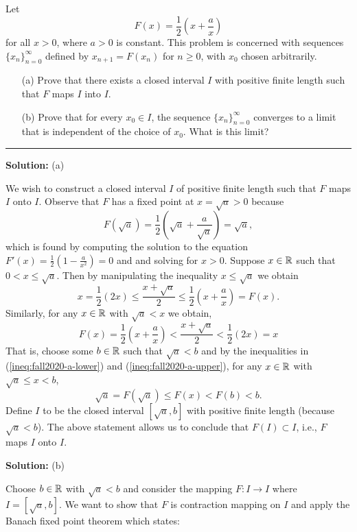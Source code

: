 \documentclass{article}
\begin{document}
Let 
	\[F(x) = \frac{1}{2}\left(x + \frac{a}{x}\right)\]
		for all $x>0$, where $a>0$ is constant. 
		This problem is concerned with sequences $\{x_n\}_{n=0}^\infty$ 
		defined by $x_{n+1} = F(x_n)$ for $n\geq 0$, with $x_0$ chosen arbitrarily.
	\begin{enumerate}
		\item[(a)] Prove that there exists a closed interval $I$ with positive finite length such that $F$ maps $I$ into $I$.
		
		\item[(b)] Prove that for every $x_0\in I$, the sequence $\{x_n\}_{n=0}^\infty$ converges to a limit 
			that is independent of the choice of $x_0$. What is this limit?
	\end{enumerate}
\hrule 

\textbf{Solution:} (a)

We wish to construct a closed interval $I$ of positive finite length such that $F$ maps $I$ onto $I$. Observe that $F$ has a fixed point at $x = \sqrt{a} > 0$ because 
	\[F(\sqrt{a}) = \frac{1}{2}\left(\sqrt{a} + \frac{a}{\sqrt{a}}\right) = \sqrt{a},\]
which is found by computing the solution to the equation $F'(x) = \frac{1}{2}\left(1 - \frac{a}{x^2}\right) = 0$ and and solving for $x>0$. Suppose $x\in\mathbb R$ such that $0 < x \leq \sqrt{a}$. Then by manipulating the inequality $x \leq \sqrt{a}$ we obtain 
	\begin{equation}\label{ineq:fall2020-a-lower}
		 x = \frac{1}{2} (2x) \leq  \frac{x + \sqrt{a}}{2} \leq \frac{1}{2}\left(x + \frac{a}{x}\right) = F(x).
	\end{equation}
Similarly, for any $x\in\mathbb R$ with $\sqrt{a} < x$ we obtain,
	\begin{equation}\label{ineq:fall2020-a-upper}
		 F(x) = \frac{1}{2}\left(x + \frac{a}{x}\right) < \frac{x + \sqrt{a}}{2} < \frac{1}{2} (2x) = x
	\end{equation}
That is, choose some $b\in\mathbb R$ such that $\sqrt{a} < b$ and by the inequalities in (\ref{ineq:fall2020-a-lower}) and (\ref{ineq:fall2020-a-upper}), for any $x\in\mathbb R$ with $\sqrt{a}\leq x < b$,
	\[\sqrt{a} = F(\sqrt{a}) \leq F(x) < F(b) < b.\]
Define $I$ to be the closed interval $[\sqrt{a}, b]$ with positive finite length (because $\sqrt{a} < b$). The above statement allows us to conclude that $F(I) \subset I$, i.e., $F$ maps $I$ onto $I$.

\textbf{Solution:} (b) 

Choose $b\in\mathbb R$ with $\sqrt{a} < b$ and consider the mapping $F: I\to I$ where $I = [\sqrt{a}, b]$. We want to show that $F$ is contraction mapping on $I$ and apply the Banach fixed point theorem which states:
\end{document}
